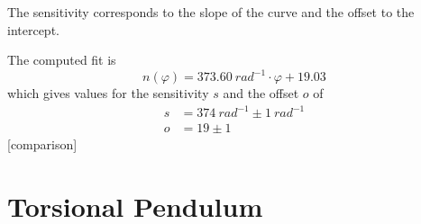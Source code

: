     The sensitivity corresponds to the slope of the curve and the offset to the intercept.\par
    The computed fit is
    \begin{equation}
        n(\varphi)=\SI{373.60}{rad^{-1}}\cdot\varphi +19.03
    \end{equation}
    which gives values for the sensitivity \( s \) and the offset \( o \) of
    \begin{align}
        s&=\SI{374}{rad^{-1}} \pm \SI{1}{rad^{-1}}\\
        o&=19 \pm 1
    \end{align}
    [comparison]

\section{Torsional Pendulum}

